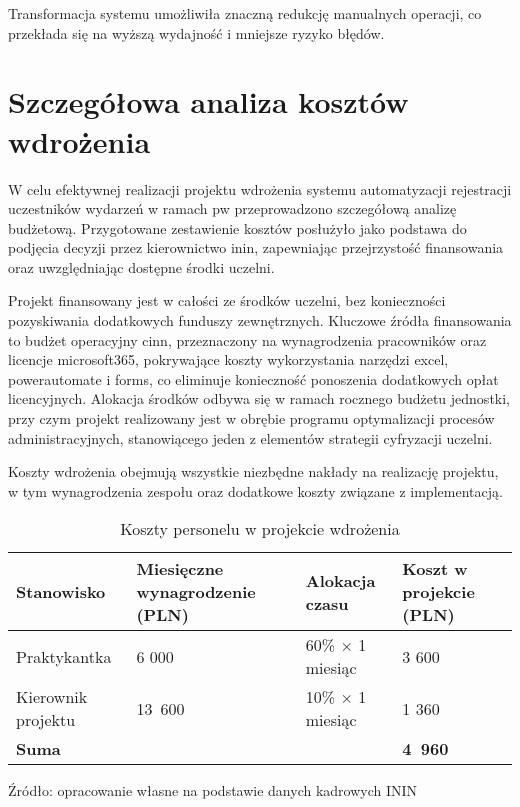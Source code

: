 Transformacja systemu umożliwiła znaczną redukcję manualnych operacji, co przekłada się na wyższą wydajność i mniejsze ryzyko błędów. 

\section{Szczegółowa analiza kosztów wdrożenia}
W celu efektywnej realizacji projektu wdrożenia systemu automatyzacji rejestracji uczestników wydarzeń w ramach \gls{pw} przeprowadzono szczegółową analizę budżetową. Przygotowane zestawienie kosztów posłużyło jako podstawa do podjęcia decyzji przez kierownictwo \gls{inin}, zapewniając przejrzystość finansowania oraz uwzględniając dostępne środki uczelni.

Projekt finansowany jest w całości ze środków uczelni, bez konieczności pozyskiwania dodatkowych funduszy zewnętrznych. Kluczowe źródła finansowania to budżet operacyjny \gls{cinn}, przeznaczony na wynagrodzenia pracowników oraz licencje \gls{microsoft365}, pokrywające koszty wykorzystania narzędzi \gls{excel}, \gls{powerautomate} i \gls{forms}, co eliminuje konieczność ponoszenia dodatkowych opłat licencyjnych. Alokacja środków odbywa się w ramach rocznego budżetu jednostki, przy czym projekt realizowany jest w obrębie programu optymalizacji procesów administracyjnych, stanowiącego jeden z elementów strategii cyfryzacji uczelni.

Koszty wdrożenia obejmują wszystkie niezbędne nakłady na realizację projektu, w tym wynagrodzenia zespołu oraz dodatkowe koszty związane z implementacją.

\begin{table}[ht]
    \centering
    \caption[Koszty personelu w projekcie wdrożenia, źródło: opracowanie własne na podstawie danych kadrowych ININ]{Koszty personelu w projekcie wdrożenia}
    \renewcommand{\arraystretch}{1.3} %
   \begin{tabular}{| p{} | p{5cm} | p{3cm} | p{} |}
        \hline
        \textbf{Stanowisko} & \textbf{Miesięczne wynagrodzenie (PLN)} & \textbf{Alokacja czasu} & \textbf{Koszt w projekcie (PLN)} \\
        \hline
        Praktykantka & 6 000 & 60\% $\times$ 1 miesiąc & 3 600 \\
        \hline
        Kierownik projektu & 13~600 & 10\% $\times$ 1 miesiąc & 1 360 \\
        \hline
        \textbf{Suma} & & & \textbf{4~960} \\
        \hline
    \end{tabular}
    \vspace{0.5em}
    \par\raggedright\footnotesize{Źródło: opracowanie własne na podstawie danych kadrowych ININ}
\end{table}


